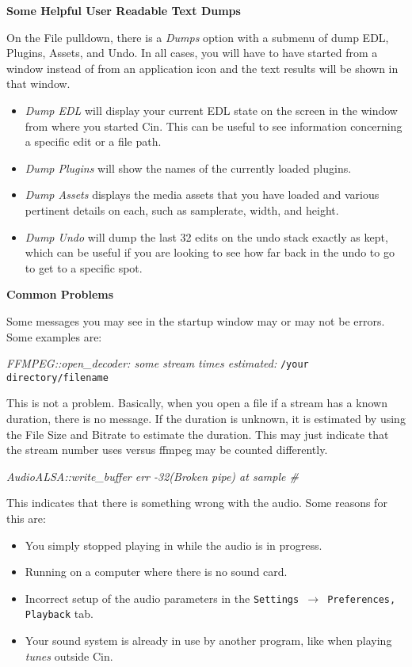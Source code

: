 \textbf{Some Helpful User Readable Text Dumps}

On the File pulldown, there is a \textit{Dumps} option with a submenu of dump EDL, Plugins, Assets, and Undo. In all cases, you will have to have started \CGG{} from a window instead of from an application icon and
the text results will be shown in that window.

\begin{itemize}[nosep]
\item \textit{Dump EDL} will display your current EDL state on the screen in the window from where you started Cin. This can be useful to see information concerning a specific edit or a file path.
\item \textit{Dump Plugins} will show the names of the currently loaded plugins.
\item \textit{Dump Assets} displays the media assets that you have loaded and various pertinent details on each, such as samplerate, width, and height.
\item \textit{Dump Undo }will dump the last 32 edits on the undo stack exactly as kept, which can be useful if you are looking to see how far back in the undo to go to get to a specific spot.
\end{itemize}

\textbf{Common Problems}

Some messages you may see in the startup window may or may not be errors. Some examples are:
\bigskip

\textit{FFMPEG::open\_decoder: some stream times estimated:} \quad \texttt{/your directory/filename}

This is not a problem. Basically, when you open a file if a stream has a known duration, there is no message. If the duration is unknown, it is estimated by using the File Size and Bitrate to estimate the duration. This may just indicate that the stream number \CGG{} uses versus ffmpeg may be counted differently.
\bigskip

\textit{AudioALSA::write\_buffer err -32(Broken pipe) at sample \#}

This indicates that there is something wrong with the audio. Some reasons for this are:
\begin{itemize}[nosep]
	\item You simply stopped playing in \CGG{} while the audio is in progress.
	\item Running on a computer where there is no sound card.
	\item Incorrect setup of the audio parameters in the \texttt{Settings $\rightarrow$ Preferences, Playback} tab.
	\item Your sound system is already in use by another program, like when playing \textit{tunes} outside Cin.
\end{itemize}
\bigskip

